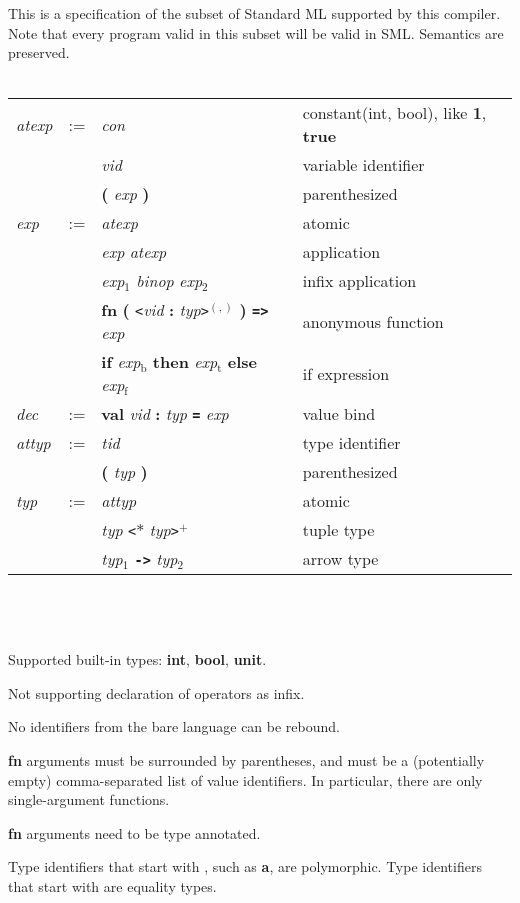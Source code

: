 \documentclass[12pt]{article}
\author{Andrey Yao}
\newcommand{\gm}[1]{\textit{#1}} %
\newcommand{\kw}[1]{\textbf{#1}} %
\newcommand{\hd}[1]{ \gm{#1} & := }
\newcommand{\row}[2]{ & #1 &  & #2\\}
\newcommand{\newrow}[2]{ & &#1 & &#2\\}
\begin{document}
This is a specification of the subset of Standard ML supported by this compiler. Note that every program valid in this subset will be valid in SML. Semantics are preserved.
\\\\
\begin{tabular}{l l l l l}
  \hline %
  \hd{atexp}
  \row{\gm{con}}{constant(int, bool), like \kw{1}, \kw{true} }
  \newrow{\gm{vid}}{variable identifier}
  \newrow{\kw{(} \gm{exp} \kw{)}}{parenthesized}
  \hd{exp}
  \row{\gm{atexp}}{atomic}
  \newrow{\gm{exp} \gm{atexp}}{application}
  \newrow{\gm{exp}$_1$ \gm{binop} \gm{exp}$_2$}{infix application}
  \newrow{\kw{fn} \kw{(} \texttt{<}\gm{vid} \kw{:} \gm{typ}\texttt{>}$^{(,)}$ \kw{)} \kw{\texttt{=>}} \gm{exp}}{anonymous function}
  \newrow{\kw{if} \gm{exp}$_\text{b}$ \kw{then} \gm{exp}$_\text{t}$ \kw{else} \gm{exp}$_\text{f}$}{if expression}
  \hd{dec}
  \row{\kw{val} \gm{vid} \kw{:} \gm{typ} \kw{\texttt{=}} \gm{exp}}{value bind}
  \hline %
  \hd{attyp}
  \row{\gm{tid}}{type identifier}
  \newrow{\kw{(} \gm{typ} \kw{)}}{parenthesized}
  \hd{typ}
  \row{\gm{attyp}}{atomic}
  \newrow{\gm{typ} \texttt{<}{\bf$*$} \gm{typ}\texttt{>}$^+$}{tuple type}
  \newrow{\gm{typ}$_1$ \kw{\texttt{->}} \gm{typ}$_2$}{arrow type}
\end{tabular}
\\\\\\

Supported built-in types: \kw{int}, \kw{bool}, \kw{unit}.

Not supporting declaration of operators as infix.

No identifiers from the bare language can be rebound.

\kw{fn} arguments must be surrounded by parentheses, and must be a (potentially empty) comma-separated list of value identifiers. In particular, there are only single-argument functions.

\kw{fn} arguments need to be type annotated.

Type identifiers that start with \kw{\textquotesingle}, such as \kw{\textquotesingle a}, are polymorphic. Type identifiers that start with \kw{\textquotesingle\textquotesingle} are equality types.
\end{document}
